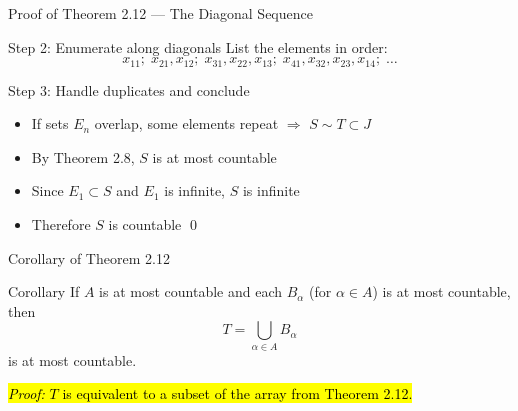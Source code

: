 \documentclass[aspectratio=169,12pt,t]{beamer}
\begin{document}
{%
\begin{frame}{Proof of Theorem 2.12 --- The Diagonal Sequence}
  \begin{proofblock}{Step 2: Enumerate along diagonals}
    List the elements in order:
    \[
      x_{11};\; x_{21}, x_{12};\; x_{31}, x_{22}, x_{13};\; x_{41}, x_{32}, x_{23}, x_{14};\; \dots
    \]
  \end{proofblock}

  \begin{proofblock}{Step 3: Handle duplicates and conclude}
    \begin{itemize}
      \item If sets $E_n$ overlap, some elements repeat $\Rightarrow$ $S \sim T \subset J$
      \item By Theorem 2.8, $S$ is at most countable
      \item Since $E_1 \subset S$ and $E_1$ is infinite, $S$ is infinite
      \item Therefore $S$ is countable \qed
    \end{itemize}
  \end{proofblock}

\end{frame}

\begin{frame}{Corollary of Theorem 2.12}
  \begin{thmblock}{Corollary}
    If $A$ is at most countable and each $B_\alpha$ (for $\alpha \in A$) is at most
    countable, then
    \[
      T = \bigcup_{\alpha \in A} B_\alpha
    \]
    is at most countable.
  \end{thmblock}

  \vspace{0.5em}
  \begin{center}
    \hl{\emph{Proof:} $T$ is equivalent to a subset of the array from Theorem 2.12.}
  \end{center}


\end{frame}}
\end{document}
